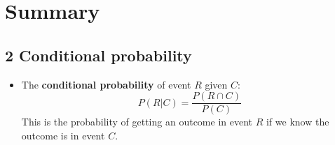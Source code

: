 
\ifind
\section*{Summary}
\else
\subsection*{2 Conditional probability}
\fi

\begin{itemize}
\item The \textbf{conditional probability} of event $R$ given $C$:
  \begin{equation}
P(R|C)=\frac{P(R\cap C)}{P(C)} 
  \end{equation}
  This is the probability of getting an outcome in event $R$ if we
  know the outcome is in event $C$.
\end{itemize}
